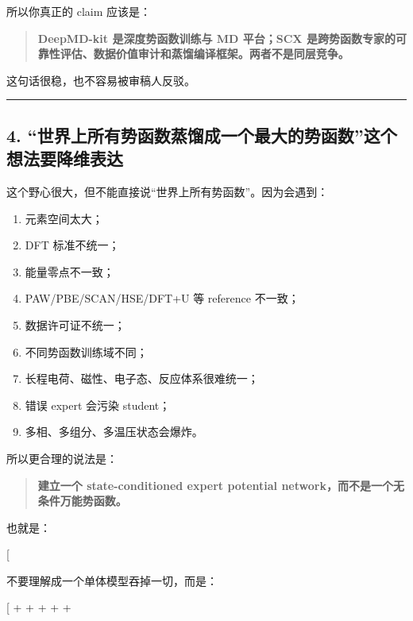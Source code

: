 \documentclass[
  12pt,
]{ctexart}
\providecommand{\tightlist}{%
  \setlength{\itemsep}{0pt}\setlength{\parskip}{0pt}}
\begin{document}
所以你真正的 claim 应该是：

\begin{quote}
\textbf{DeepMD-kit 是深度势函数训练与 MD 平台；SCX
是跨势函数专家的可靠性评估、数据价值审计和蒸馏编译框架。两者不是同层竞争。}
\end{quote}

这句话很稳，也不容易被审稿人反驳。

\begin{center}\rule{0.5\linewidth}{0.5pt}\end{center}

\subsection{4.
``世界上所有势函数蒸馏成一个最大的势函数''这个想法要降维表达}\label{ux4e16ux754cux4e0aux6240ux6709ux52bfux51fdux6570ux84b8ux998fux6210ux4e00ux4e2aux6700ux5927ux7684ux52bfux51fdux6570ux8fd9ux4e2aux60f3ux6cd5ux8981ux964dux7ef4ux8868ux8fbe}

这个野心很大，但不能直接说``世界上所有势函数''。因为会遇到：

\begin{enumerate}
\def\labelenumi{\arabic{enumi}.}
\tightlist
\item
  元素空间太大；
\item
  DFT 标准不统一；
\item
  能量零点不一致；
\item
  PAW/PBE/SCAN/HSE/DFT+U 等 reference 不一致；
\item
  数据许可证不统一；
\item
  不同势函数训练域不同；
\item
  长程电荷、磁性、电子态、反应体系很难统一；
\item
  错误 expert 会污染 student；
\item
  多相、多组分、多温压状态会爆炸。
\end{enumerate}

所以更合理的说法是：

\begin{quote}
\textbf{建立一个 state-conditioned expert potential
network，而不是一个无条件万能势函数。}
\end{quote}

也就是：

{[} \text{Universal potential}{]}

不要理解成一个单体模型吞掉一切，而是：

{[}  +  +
 +  +  +
\text{student potentials}{]}
\end{document}
